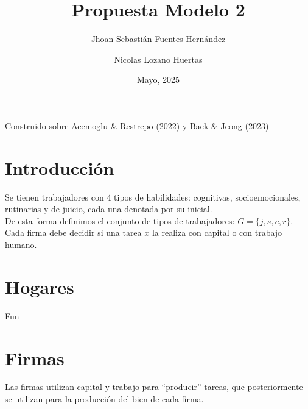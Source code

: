 \documentclass{article}
\title{\textbf{Propuesta Modelo 2}}
\author{Jhoan Sebasti\'an Fuentes Hern\'andez \and Nicolas Lozano Huertas}
\date{Mayo, 2025}
\theoremstyle{remark}
\theoremstyle{definition}
\begin{document}
\maketitle

Construido sobre Acemoglu \& Restrepo (2022) y Baek \& Jeong (2023)

\section{Introducci\'on}
Se tienen trabajadores con 4 tipos de habilidades: cognitivas, socioemocionales, rutinarias y de juicio, cada una denotada por su inicial. \\
De esta forma definimos el conjunto de tipos de trabajadores: $G=\{j,s,c,r\}$.\\
Cada firma debe decidir si una tarea $x$ la realiza con capital o con trabajo humano.

\section{Hogares}

Fun

\section{Firmas}

Las firmas utilizan capital y trabajo para ``producir'' tareas, que posteriormente se utilizan para la producci\'on del bien de cada firma.
\end{document}

